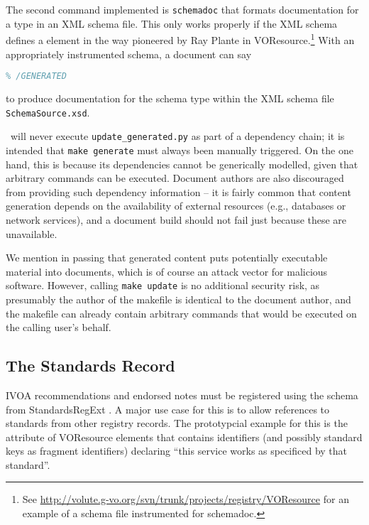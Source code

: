 \documentclass[11pt,a4paper]{ivoa}
\begin{document}
The second command implemented is \texttt{schemadoc} that formats
documentation for a type in an XML schema file.  This only works
properly if the XML schema defines a  element in
the way pioneered by Ray Plante in
VOResource.\footnote{See
\url{http://volute.g-vo.org/svn/trunk/projects/registry/VOResource} for
an example of a schema file instrumented for schemadoc.}
With an appropriately instrumented schema, a document can say

\begin{lstlisting}[language=TeX]
% GENERATED: !schemadoc SchemaSource.xsd MyType
% /GENERATED
\end{lstlisting}

to produce documentation for the schema type  within
the XML schema file \texttt{SchemaSource.xsd}.

\ivoatex~will never execute \texttt{update\_generated.py} as part of a
dependency chain; it is intended that \texttt{make generate} must always
been manually triggered.  On the one hand, this is because its
dependencies cannot be generically modelled, given that arbitrary
commands can be executed.  Document authors are also discouraged from
providing such dependency information -- it is fairly common that
content generation depends on the availability of external resources
(e.g., databases or network services), and a document build should not
fail just because these are unavailable.

We mention in passing that generated content puts potentially executable
material into documents, which is of course an attack vector for
malicious software.  However, calling \texttt{make update} is no
additional security risk, as presumably the author of the makefile is
identical to the document author, and the makefile can already contain
arbitrary commands that would be executed on the calling user's behalf.

\subsection{The Standards Record}

IVOA recommendations and endorsed notes must be registered using the
schema from StandardsRegExt \citep{2012ivoa.spec.0508H}.  A major use
case for this is to allow references to standards from other registry
records. The prototypcial example for this is the 
attribute of VOResource  elements that contains
identifiers (and possibly standard keys as fragment identifiers)
declaring ``this service works as specificed by that standard''.
\end{document}
